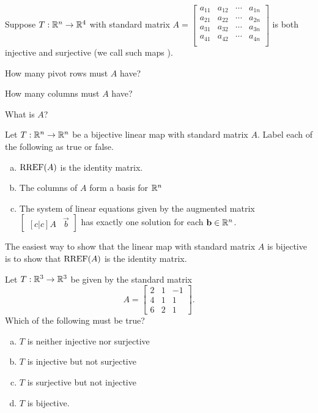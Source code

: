 \begin{activity}{5}
Suppose \(T: \mathbb{R}^n \rightarrow \mathbb{R}^4\) with standard matrix 
\(A=\begin{bmatrix}
  a_{11}&a_{12}&\cdots&a_{1n}\\
  a_{21}&a_{22}&\cdots&a_{2n}\\
  a_{31}&a_{32}&\cdots&a_{3n}\\
  a_{41}&a_{42}&\cdots&a_{4n}\\
\end{bmatrix}\) is both 
injective and surjective (we call such maps ).
\begin{subactivity}
How many pivot rows must \(A\) have?
\end{subactivity}
\begin{subactivity}
 How many columns must \(A\) have?
\end{subactivity}
\begin{subactivity}
What is \(A\)?
\end{subactivity}
\end{activity}


\begin{activity}{5}
Let $T: \mathbb{R}^n \rightarrow \mathbb{R}^n$ be a bijective linear map with
standard matrix $A$. Label each of the following as true or false.
\begin{enumerate}[(a)]
\item $\operatorname{RREF}(A)$ is the identity matrix.
\item The columns of $A$ form a basis for $\mathbb{R}^n$
\item The system of linear equations given by the augmented matrix $\begin{bmatrix}[c|c] A & \vec{b} \end{bmatrix}$ has exactly one solution
for each \(\mathbf b \in \mathbb{R}^n\).
\end{enumerate}
\end{activity}

\begin{observation}
  The easiest way to show that the linear map with standard matrix \(A\)
  is bijective is to show that \(\operatorname{RREF}(A)\) is the identity matrix.
\end{observation}

\begin{activity}{3}
Let $T: \mathbb{R}^3 \rightarrow \mathbb{R}^3$ be given by the standard matrix $$A=\begin{bmatrix} 2&1&-1 \\ 4&1&1 \\ 6&2&1\end{bmatrix}.$$ Which of the following must be true?
\begin{enumerate}[(a)]
\item $T$ is neither injective nor surjective
\item $T$ is injective but not surjective
\item $T$ is surjective but not injective
\item $T$ is bijective.
\end{enumerate}
\end{activity}


